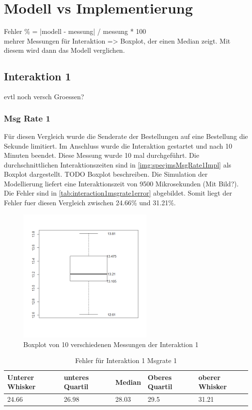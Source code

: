 \section{Modell vs Implementierung}
Fehler \% = |modell - messung| / messung * 100 \\
mehrer Messungen für Interaktion => Boxplot, der einen Median zeigt. Mit diesem wird dann das Modell verglichen.
\subsection{Interaktion 1}
evtl noch versch Groessen?
\subsubsection{Msg Rate 1}
Für diesen Vergleich wurde die Senderate der Bestellungen auf eine Bestellung die Sekunde limitiert. Im Anschluss wurde die Interaktion gestartet und nach 10 Minuten beendet. Diese Messung wurde 10 mal durchgeführt. Die durchschnittlichen Interaktionszeiten sind in \autoref{img:specjmsMsgRate1Impl} als Boxplot dargestellt. TODO Boxplot beschreiben. Die Simulation der Modellierung liefert eine Interaktionszeit von 9500 Mikrosekunden (Mit Bild?). Die Fehler sind in \autoref{tab:interaction1msgrate1error} abgebildet. Somit liegt der Fehler fuer diesen Vergleich zwischen 24.66\% und 31.21\%. 
\begin{figure}
\center
  \includegraphics[width=0.6\textwidth]{images/evaluation/specjms/interaction1msgrate1.png}
  \caption{Boxplot von 10 verschiedenen Messungen der Interaktion 1}
  \label{img:specjmsMsgRate1Impl}
\end{figure}
\begin{table}
  \begin{tabular}{|l|l|l|l|l|}
    Unterer Whisker & unteres Quartil & Median & Oberes Quartil & oberer Whisker \\
    \hline
    24.66 & 26.98 & 28.03 & 29.5 & 31.21
  \end{tabular}
	\caption{\label{tab:interaction1msgrate1error} Fehler für Interaktion 1 Msgrate 1}
\end{table}

